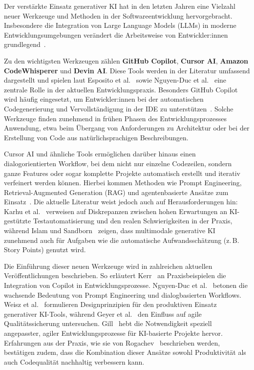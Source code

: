 Der verstärkte Einsatz generativer KI hat in den letzten Jahren eine Vielzahl
neuer Werkzeuge und Methoden in der Softwareentwicklung hervorgebracht.
Insbesondere die Integration von Large Language Models (LLMs) in moderne
Entwicklungsumgebungen verändert die Arbeitsweise von Entwickler:innen
grundlegend~\cite{esposito_generative_2025,nguyen-duc_generative_2023}.

Zu den wichtigsten Werkzeugen zählen \textbf{GitHub Copilot}, \textbf{Cursor
    AI}, \textbf{Amazon CodeWhisperer} und \textbf{Devin AI}. Diese Tools werden in
der Literatur umfassend dargestellt und spielen laut Esposito et
al.~\cite{esposito_generative_2025} sowie Nguyen-Duc et
al.~\cite{nguyen-duc_generative_2023} eine zentrale Rolle in der aktuellen
Entwicklungspraxis. Besonders GitHub Copilot wird häufig eingesetzt, um
Entwickler:innen bei der automatischen Codegenerierung und Vervollständigung in
der IDE zu unterstützen~\cite{esposito_generative_2025}. Solche Werkzeuge
finden zunehmend in frühen Phasen des Entwicklungsprozesses Anwendung, etwa
beim Übergang von Anforderungen zu Architektur oder bei der Erstellung von Code
aus natürlichsprachigen Beschreibungen.

Cursor AI und ähnliche Tools ermöglichen darüber hinaus einen
dialogorientierten Workflow, bei dem nicht nur einzelne Codezeilen, sondern
ganze Features oder sogar komplette Projekte automatisch erstellt und iterativ
verfeinert werden können. Hierbei kommen Methoden wie Prompt Engineering,
Retrieval-Augmented Generation (RAG) und agentenbasierte Ansätze zum
Einsatz~\cite{esposito_generative_2025}. Die aktuelle Literatur weist jedoch
auch auf Herausforderungen hin: Karhu et al.~\cite{karhu_expectations_2025}
verweisen auf Diskrepanzen zwischen hohen Erwartungen an KI-gestützte
Testautomatisierung und den realen Schwierigkeiten in der Praxis, während Islam
und Sandborn~\cite{islam_multimodal_2025} zeigen, dass multimodale generative
KI zunehmend auch für Aufgaben wie die automatische Aufwandsschätzung (z.\,B.
Story Points) genutzt wird.

Die Einführung dieser neuen Werkzeuge wird in zahlreichen aktuellen
Veröffentlichungen beschrieben. So erläutert Kerr~\cite{kerr_github_nodate} an
Praxisbeispielen die Integration von Copilot in Entwicklungsprozesse.
Nguyen-Duc et al.~\cite{nguyen-duc_generative_2023} betonen die wachsende
Bedeutung von Prompt Engineering und dialogbasierten Workflows. Weisz et
al.~\cite{weisz_design_2024} formulieren Designprinzipien für den produktiven
Einsatz generativer KI-Tools, während Geyer et al.~\cite{geyer_case_2025} den
Einfluss auf agile Qualitätssicherung untersuchen. Gill~\cite{gill_agile_2025}
hebt die Notwendigkeit speziell angepasster, agiler Entwicklungsprozesse für
KI-basierte Projekte hervor. Erfahrungen aus der Praxis, wie sie von
Rogachev~\cite{rogachev_my_nodate} beschrieben werden, bestätigen zudem, dass
die Kombination dieser Ansätze sowohl Produktivität als auch Codequalität
nachhaltig verbessern kann.

